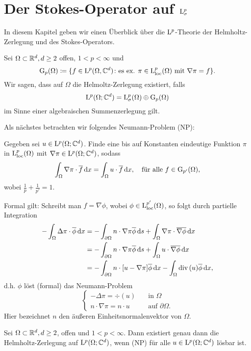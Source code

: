 \chapter{Der Stokes-Operator auf \texorpdfstring{$\mathrm{L}_\sigma^p$}{Lsigma\textasciicircum p}}

In diesem Kapitel geben wir einen Überblick über die $\mathrm{L}^p$-Theorie der Helmholtz-Zerlegung und des Stokes-Operators.

Sei $\Omega \subset \mathbb{R}^d, d \geq 2$ offen, $1 < p < \infty$ und 
$$
\mathrm{G}_p(\Omega) \coloneqq \{ f \in \mathrm{L}^p(\Omega, \mathbb{C}^d) \colon \text{es ex. } \pi \in \mathrm{L}_{\operatorname{loc}}^p(\Omega) \text{ mit } \nabla \pi = f\}.
$$
Wir sagen, dass auf $\Omega$ die Helmoltz-Zerlegung existiert, falls
$$
\mathrm{L}^p(\Omega; \mathbb{C}^d) = \mathrm{L}_\sigma^p(\Omega) \oplus \mathrm{G}_p(\Omega)
$$
im Sinne einer algebraischen Summenzerlegung gilt.

Als nächstes betrachten wir folgendes Neumann-Problem (NP):

Gegeben sei $u \in \mathrm{L}^p(\Omega; \mathbb{C}^d)$.
Finde eine bis auf Konstanten eindeutige Funktion $\pi$ in $\mathrm{L}_{\operatorname{loc}}^p(\Omega)$ mit $\nabla \pi \in \mathrm{L}^p(\Omega; \mathbb{C}^d)$, sodass
$$
\int_\Omega \nabla \pi \cdot \overline f \, {\operatorname{d}\!{x}} = \int_\Omega u \cdot \overline f \, {\operatorname{d}\!{x}}, \quad\text{für alle } f \in \mathrm{G}_{p'}(\Omega),
$$
wobei $\frac{1}{p} + \frac{1}{p'} = 1$.

Formal gilt: Schreibt man $f = \nabla \phi$, wobei $\phi \in \mathrm{L}^{p'}_{\operatorname{loc}}(\Omega)$, so folgt durch partielle Integration
\begin{align*}
  -\int_\Omega \Delta\pi \cdot \overline{\phi} \, {\operatorname{d}\!{x}}
  &= -\int_{\partial\Omega} n \cdot \nabla\pi \overline\phi \, {\operatorname{d}\!{s}}
     +\int_\Omega \nabla \pi \cdot \overline{\nabla \phi} \, {\operatorname{d}\!{x}} \\
  &= - \int_{\partial\Omega} n \cdot \nabla \pi \overline \phi \, {\operatorname{d}\!{s}} 
     + \int_\Omega u \cdot \overline{\nabla \phi} \, {\operatorname{d}\!{x}} \\
     &= -\int_{\partial\Omega} n \cdot [u - \nabla\pi] \overline \phi \, {\operatorname{d}\!{x}}
        - \int_\Omega \mathrm{div\,} (u) \overline\phi \, {\operatorname{d}\!{x}},
\end{align*}
d.h. $\phi$ löst (formal) das Neumann-Problem
$$
\begin{cases}
  -\Delta \pi = \div (u)         &\quad\text{in } \Omega \\
  n \cdot \nabla \pi = n \cdot u &\quad\text{auf } \partial\Omega.
\end{cases}
$$
Hier bezeichnet $n$ den äußeren Einheitsnormalenvektor von $\Omega$.

\begin{thm}
  \label{thm:helmholtzIffNeumann}
  Sei $\Omega \subset \mathbb{R}^d, d \geq 2$, offen und $1 < p < \infty$.
  Dann existiert genau dann die Helmholtz-Zerlegung auf $\mathrm{L}^p(\Omega; \mathbb{C}^d)$, wenn (NP) für alle $u \in \mathrm{L}^p(\Omega; \mathbb{C}^d)$ lösbar ist.
\end{thm}

